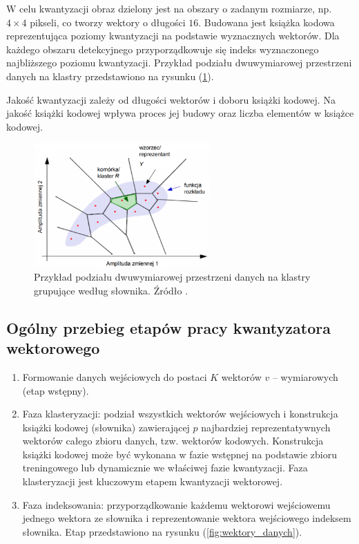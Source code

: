 \documentclass{article}
\begin{document}
W celu kwantyzacji obraz dzielony jest na obszary o zadanym rozmiarze, np. $4 \times 4$ pikseli, co tworzy wektory o długości $16$.
Budowana jest książka kodowa reprezentująca poziomy kwantyzacji na podstawie wyznacznych wektorów.
Dla każdego obszaru detekcyjnego przyporządkowuje się indeks wyznaczonego najbliższego poziomu kwantyzacji. Przykład podziału dwuwymiarowej przestrzeni danych na klastry przedstawiono na rysunku (\ref{fig:kwantyzacja_wektorowa}).

Jakość kwantyzacji zależy od długości wektorów i doboru książki kodowej. Na jakość książki kodowej wpływa proces jej budowy oraz liczba elementów w książce kodowej.

\begin{figure}[h]
  \centering
  \includegraphics[width=0.6\textwidth]{images/kwantyzacja_wektorowa.png}
  \caption{Przykład podziału dwuwymiarowej przestrzeni danych na klastry grupujące według słownika. Źródło \cite{mwilczewski}.}
  \label{fig:kwantyzacja_wektorowa}
\end{figure}

\subsection{Ogólny przebieg etapów pracy kwantyzatora wektorowego}

\begin{enumerate}
  \item Formowanie danych wejściowych do postaci $K$ wektorów $v$ -- wymiarowych (etap wstępny).
  \item Faza klasteryzacji: podział wszystkich wektorów wejściowych i konstrukcja książki
        kodowej (słownika) zawierającej $p$ najbardziej reprezentatywnych wektorów całego zbioru danych,
        tzw. wektorów kodowych. Konstrukcja książki kodowej może być wykonana w fazie wstępnej na podstawie zbioru
        treningowego lub dynamicznie we właściwej fazie kwantyzacji. Faza klasteryzacji jest kluczowym etapem kwantyzacji wektorowej.
  \item Faza indeksowania: przyporządkowanie każdemu wektorowi wejściowemu jednego wektora ze słownika i reprezentowanie wektora wejściowego indeksem słownika. Etap przedstawiono na rysunku (\ref{fig:wektory_danych}).
\end{enumerate}
\end{document}
